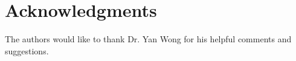 \documentclass[10pt,twoside,lineno]{gsajnl}
\begin{document}

\section{Acknowledgments}
The authors would like to thank Dr. Yan Wong for his helpful comments and suggestions.



\appendix
\renewcommand{\thefigure}{S\arabic{figure}}
\setcounter{figure}{0}
\end{document}
